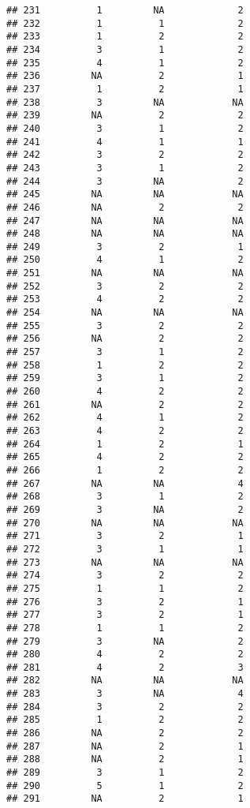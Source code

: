 \documentclass[
]{article}
\begin{document}
\begin{verbatim}
## 231          1         NA             2
## 232          1          1             2
## 233          1          2             2
## 234          3          1             2
## 235          4          1             2
## 236         NA          2             1
## 237          1          2             1
## 238          3         NA            NA
## 239         NA          2             2
## 240          3          1             2
## 241          4          1             1
## 242          3          2             2
## 243          3          1             2
## 244          3         NA             2
## 245         NA         NA            NA
## 246         NA          2             2
## 247         NA         NA            NA
## 248         NA         NA            NA
## 249          3          2             1
## 250          4          1             2
## 251         NA         NA            NA
## 252          3          2             2
## 253          4          2             2
## 254         NA         NA            NA
## 255          3          2             2
## 256         NA          2             2
## 257          3          1             2
## 258          1          2             2
## 259          3          1             2
## 260          4          2             2
## 261         NA          2             2
## 262          4          1             2
## 263          4          2             2
## 264          1          2             1
## 265          4          2             2
## 266          1          2             2
## 267         NA         NA             4
## 268          3          1             2
## 269          3         NA             2
## 270         NA         NA            NA
## 271          3          2             1
## 272          3          1             1
## 273         NA         NA            NA
## 274          3          2             2
## 275          1          1             2
## 276          3          2             1
## 277          3          2             1
## 278          1          1             2
## 279          3         NA             2
## 280          4          2             2
## 281          4          2             3
## 282         NA         NA            NA
## 283          3         NA             4
## 284          3          2             2
## 285          1          2             2
## 286         NA          2             2
## 287         NA          2             1
## 288         NA          2             1
## 289          3          1             2
## 290          5          1             2
## 291         NA          2             1

\end{verbatim}
\end{document}
